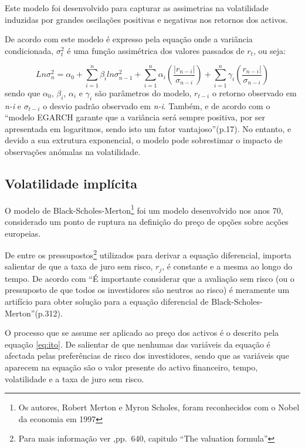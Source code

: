 \documentclass[
  12pt,
  a4paper,
  openany]{book}
\theoremstyle{definition}
\theoremstyle{definition}
\theoremstyle{definition}
\theoremstyle{remark}
\begin{document}
Este modelo foi desenvolvido para capturar as assimetrias na volatilidade induzidas por grandes oscilações positivas e negativas nos retornos dos activos.

De acordo com \citet{marta} este modelo é expresso pela equação onde a variância condicionada, \(\sigma_t^2\) é uma função assimétrica dos valores passados de \(r_t\), ou seja:

\begin{equation} 
  Ln \sigma_{n}^{2}= \alpha_0+\sum_{i=1}^n\beta_iln\sigma_{n-1}^2+\sum_{i=1}^n\alpha_i(\frac{|r_{n-i}|}{\sigma_{n-i}})+\sum_{i=1}^n\gamma_i(\frac{r_{n-i}|}{\sigma_{n-i}})
  \label{eq:egarch}
\end{equation}
sendo que \(\alpha_0\), \(\beta_i\), \(\alpha_i\) e \(\gamma_i\) são parâmetros do modelo, \(r_{t-i}\) o retorno observado em \emph{n-i} e \(\sigma_{t-i}\) o desvio padrão observado em \emph{n-i}. Também, e de acordo com \citet{marta} o ``modelo EGARCH garante que a variância será sempre positiva, por ser apresentada em logaritmos, sendo isto um fator vantajoso''(p.17). No entanto, e devido a sua extrutura exponencial, o modelo pode sobrestimar o impacto de observações anómalas na volatilidade.

\hypertarget{volatilidade-impluxedcita}{%
\subsection{Volatilidade implícita}\label{volatilidade-impluxedcita}}

O modelo de Black-Scholes-Merton\footnote{Os autores, Robert Merton e Myron Scholes, foram reconhecidos com o Nobel da economia em 1997} foi um modelo desenvolvido nos anos 70, considerado um ponto de ruptura na definição do preço de opções sobre acções europeias.

De entre os pressupostos\footnote{Para mais informação ver \citet{BlackScholes},pp.~640, capitulo ``The valuation formula''} utilizados para derivar a equação diferencial, importa salientar de que a taxa de juro sem risco, \(r_j\), é constante e a mesma ao longo do tempo. De acordo com \citet{Hull2018} ``É importante considerar que a avaliação sem risco (ou o pressuposto de que todos os investidores são neutros ao risco) é meramente um artifício para obter solução para a equação diferencial de Black-Scholes-Merton''(p.312).

O processo que se assume ser aplicado ao preço dos activos é o descrito pela equação \eqref{eq:ito}. De salientar de que nenhumas das variáveis da equação é afectada pelas preferências de risco dos investidores, sendo que as variáveis que aparecem na equação são o valor presente do activo financeiro, tempo, volatilidade e a taxa de juro sem risco.
\end{document}
